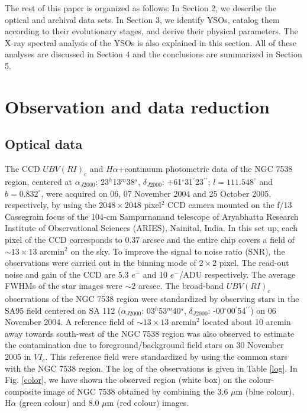 \documentclass[a4paper,fleqn,usenatbib,useAMS]{mnras}
\begin{document}
The rest of this paper is organized as follows: 
In Section 2, we describe the optical and archival data sets. 
In Section 3, we identify YSOs, catalog them according to their evolutionary stages,
and derive their physical parameters.
The X-ray spectral analysis of the YSOs is also explained in this section.
All of these analyses are discussed in Section 4  and
the conclusions are summarized in Section 5.

\section{Observation and data reduction}

\subsection{Optical data}

The CCD $UBV{(RI)}_c$ and $H\alpha$+continuum photometric data of the NGC 7538 region, 
centered at $\alpha_{J2000}$: 23$^h$13$^m$38$^s$, $\delta_{J2000}$: +61$^\circ$31$^\prime$23$^\prime$$^\prime$; 
$l=111.548^\circ$ and $b=0.832^\circ$,
were acquired on 06, 07 November 2004 and 25 October 2005, respectively, by using 
the $2048\times 2048$ pixel$^2$ CCD camera mounted on the f/13 Cassegrain focus of the 
104-cm Sampurnanand telescope of Aryabhatta Research Institute of Observational Sciences (ARIES), Nainital, India. 
In this set up, each pixel of the CCD corresponds to $0.37$ arcsec and the entire chip 
covers a field of $\sim 13\times13$ arcmin$^2$ on the sky. 
To improve the signal to noise ratio (SNR), the observations were carried out in 
the binning mode of $2\times2$ pixel. 
The read-out noise and gain of the CCD are 5.3 $e^-$ and 10 $e^-$/ADU respectively. 
The average FWHMs of the star images were $\sim2$ arcsec. 
The broad-band $UBV{(RI)}_c$ observations of the NGC 7538 region were standardized by observing stars in the 
SA95 field  \citep{1992AJ....104..340L} centered on SA 112  
($\alpha_{J2000}$: 03$^h$53$^m$40$^s$, $\delta_{J2000}$: -00$^\circ$00$^\prime$54$^\prime$$^\prime$)
on 06 November 2004. 
A reference field of $\sim 13\times13$ arcmin$^2$ located about
10 arcmin away towards south-west of the NGC 7538 region was also observed to estimate 
the contamination due to foreground/background field stars on 30 November 2005 in $VI_c$.
This reference field were standardized by using the common stars with the NGC 7538 region.
The log of the observations is given in Table \ref{log}.
In Fig. \ref{color}, we have shown the observed region (white box) on the colour-composite image 
of NGC 7538  obtained by combining the 3.6 $\mu$m (blue colour), H$\alpha$ (green colour) and 8.0 $\mu$m (red colour) images.
\end{document}

